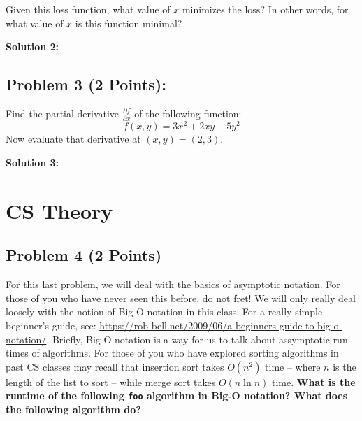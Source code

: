 \documentclass[]{article}
\begin{document}
Given this loss function, what value of $x$ minimizes the loss?  In other words, for what value of $x$ is this function minimal?

\bigskip
\textbf{Solution 2:}

\bigskip
\bigskip
\bigskip
\bigskip
\bigskip

\subsection*{Problem 3 (2 Points):}
Find the partial derivative $\frac{\partial f}{\partial x}$ of the following function:
$$ f(x, y) = 3x^2 + 2xy - 5y^2 $$
Now evaluate that derivative at $(x,y) = (2,3)$.

\bigskip
\textbf{Solution 3:}

\clearpage
\section{CS Theory}
\subsection*{Problem 4 (2 Points)}
For this last problem, we will deal with the basics of asymptotic notation. For those of you who have never seen this before, do not fret!  We will only really deal loosely with the notion of Big-O notation in this class.  For a really simple beginner's guide, see: \url{https://rob-bell.net/2009/06/a-beginners-guide-to-big-o-notation/}. Briefly, Big-O notation is a way for us to talk about assymptotic run-times of algorithms. For those of you who have explored sorting algorithms in past CS classes may recall that insertion sort takes $O(n^2)$ time -- where $n$ is the length of the list to sort -- while merge sort takes $O(n\ln n)$ time. \textbf{What is the runtime of the following \texttt{foo} algorithm in Big-O notation?  What does the following algorithm do?}
\end{document}
